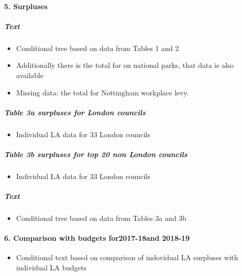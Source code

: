 \documentclass[]{article}
\providecommand{\tightlist}{%
  \setlength{\itemsep}{0pt}\setlength{\parskip}{0pt}}
\let\oldparagraph\paragraph
\renewcommand{\paragraph}[1]{\oldparagraph{#1}\mbox{}}
\let\oldsubparagraph\subparagraph
\renewcommand{\subparagraph}[1]{\oldsubparagraph{#1}\mbox{}}
\begin{document}
\hypertarget{surpluses-1}{%
\paragraph{5. Surpluses}\label{surpluses-1}}

\hypertarget{text-13}{%
\subparagraph{Text}\label{text-13}}

\begin{itemize}
\tightlist
\item
  Conditional tree based on data from Tables 1 and 2
\item
  Additionally there is the total for on national parks, that data is
  also available
\item
  Missing data: the total for Nottingham workplace levy.
\end{itemize}

\hypertarget{table-3a-surpluses-for-london-councils}{%
\subparagraph{Table 3a surpluses for London
councils}\label{table-3a-surpluses-for-london-councils}}

\begin{itemize}
\tightlist
\item
  Individual LA data for 33 London councils
\end{itemize}

\hypertarget{table-3b-surpluses-for-top-20-non-london-councils}{%
\subparagraph{Table 3b surpluses for top 20 non London
councils}\label{table-3b-surpluses-for-top-20-non-london-councils}}

\begin{itemize}
\tightlist
\item
  Individual LA data for 33 London councils
\end{itemize}

\hypertarget{text-14}{%
\subparagraph{Text}\label{text-14}}

\begin{itemize}
\tightlist
\item
  Conditional tree based on data from Tables 3a and 3b
\end{itemize}

\hypertarget{comparison-with-budgets-for2017-18and-2018-19}{%
\paragraph{6. Comparison with budgets for2017-18and
2018-19}\label{comparison-with-budgets-for2017-18and-2018-19}}

\begin{itemize}
\tightlist
\item
  Conditional text based on comparison of indovidual LA surpluses with
  individual LA budgets
\end{itemize}
\end{document}
